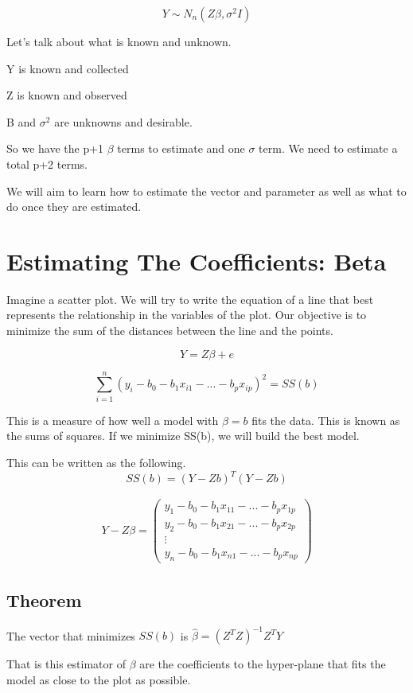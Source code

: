 \[Y \sim N_n(Z\beta , \sigma^2 I)\]

Let's talk about what is known and unknown.

Y is known and collected

Z is known and observed

B and $\sigma^2$ are unknowns and desirable.

So we have the p+1 $\beta$ terms to estimate and one $\sigma$ term. We need to estimate a total p+2 terms.

We will aim to learn how to estimate the vector and parameter as well as what to do once they are estimated.

\section{Estimating The Coefficients: Beta}

Imagine a scatter plot. We will try to write the equation of a line that best represents the relationship in the variables of the plot. Our objective is to minimize the sum of the distances between the line and the points.

\[Y = Z \beta + e\]

\[\displaystyle\sum_{i=1}^n(y_i - b_0 - b_1x_{i1}-...-b_px_{ip})^2 = SS(b)\]

This is a measure of how well a model with $\beta = b$ fits the data. This is known as the sums of squares. If we minimize SS(b), we will build the best model.

This can be written as the following.
\[SS(b) = (Y-Zb)^T(Y-Zb)\]

\begin{align*}
Y-Z\beta = \begin{pmatrix}
y_1 - b_0 - b_1x_{11}-...-b_px_{1p} \\
y_2 - b_0 - b_1x_{21}-...-b_px_{2p}\\
\vdots \\
y_n - b_0 - b_1x_{n1}-...-b_px_{np}
\end{pmatrix}
\end{align*}

\subsection{Theorem}
The vector that minimizes $SS(b)$ is $\hat{\beta} = (Z^TZ)^{-1}Z^TY$

That is this estimator of $\beta$ are the coefficients to the hyper-plane that fits the model as close to the plot as possible. 

